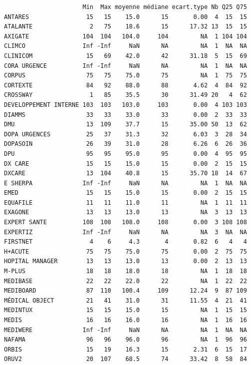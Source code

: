 \documentclass[]{article}
\begin{document}
\begin{verbatim}
                      Min  Max moyenne médiane ecart.type Nb Q25 Q75
ANTARES                15   15    15.0      15       0.00  4  15  15
ATALANTE                2   75    18.6      15      17.32 13  15  15
AXIGATE               104  104   104.0     104         NA  1 104 104
CLIMCO                Inf -Inf     NaN      NA         NA  1  NA  NA
CLINICOM               15   69    42.0      42      31.18  5  15  69
CORA URGENCE          Inf -Inf     NaN      NA         NA  1  NA  NA
CORPUS                 75   75    75.0      75         NA  1  75  75
CORTEXTE               84   92    88.0      88       4.62  4  84  92
CROSSWAY                1   85    35.5      30      31.49 20   4  62
DEVELOPPEMENT INTERNE 103  103   103.0     103       0.00  4 103 103
DIAMMS                 33   33    33.0      33       0.00  2  33  33
DMU                    13  109    37.7      15      35.00 50  13  62
DOPA URGENCES          25   37    31.3      32       6.03  3  28  34
DOPASOIN               26   39    31.0      28       6.26  6  26  36
DPU                    95   95    95.0      95       0.00  4  95  95
DX CARE                15   15    15.0      15       0.00  2  15  15
DXCARE                 13  104    40.8      15      35.70 18  14  67
E SHERPA              Inf -Inf     NaN      NA         NA  1  NA  NA
EMED                   15   15    15.0      15       0.00  2  15  15
EQUAFILE               11   11    11.0      11         NA  1  11  11
EXAGONE                13   13    13.0      13         NA  3  13  13
EXPERT SANTE          108  108   108.0     108       0.00  3 108 108
EXPERTIZ              Inf -Inf     NaN      NA         NA  3  NA  NA
FIRSTNET                4    6     4.3       4       0.82  6   4   4
H+ACUTE                75   75    75.0      75       0.00  2  75  75
HOPITAL MANAGER        13   13    13.0      13       0.00  2  13  13
M-PLUS                 18   18    18.0      18         NA  1  18  18
MEDIBASE               22   22    22.0      22         NA  1  22  22
MEDIBOARD              87  110   100.4     109      12.24  9  87 109
MÉDICAL OBJECT         21   41    31.0      31      11.55  4  21  41
MEDINTUX               15   15    15.0      15         NA  1  15  15
MEDIS                  16   16    16.0      16         NA  1  16  16
MEDIWERE              Inf -Inf     NaN      NA         NA  1  NA  NA
NAFAMA                 96   96    96.0      96         NA  1  96  96
ORBIS                  15   19    16.3      15       2.31  6  15  17
ORUV2                  20  107    68.5      74      33.42  8  58  84

\end{verbatim}
\end{document}
